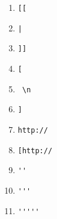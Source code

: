 \documentclass[a4paper,11pt]{article}
\begin{document}
\begin{center}
 \begin{enumerate}
\item\begin{verbatim}[[\end{verbatim} 
\item	\begin{verbatim}|\end{verbatim} 
\item	\begin{verbatim}]]\end{verbatim} 
\item	\begin{verbatim}[\end{verbatim} 
\item	\begin{verbatim} \n\end{verbatim} 
\item	\begin{verbatim}]\end{verbatim} 
\item	\begin{verbatim}http://\end{verbatim} 
\item	\begin{verbatim}[http://\end{verbatim} 
\item	\begin{verbatim}''\end{verbatim} 
\item	\begin{verbatim}'''\end{verbatim} 
\item	\begin{verbatim}'''''\end{verbatim} 


\end{enumerate}
\end{center}
\end{document}
